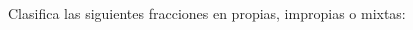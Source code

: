 \documentclass[12pt,addpoints]{evalua}
\begin{document}
\begin{questions}
    \newpage
    \section*{\else{}\fi}

    \subsection*{\else{}\fi}

    \question[8] Clasifica las siguientes fracciones en propias, impropias o mixtas:
    \begin{multicols}{2}
\end{multicols}
\end{questions}
\end{document}

